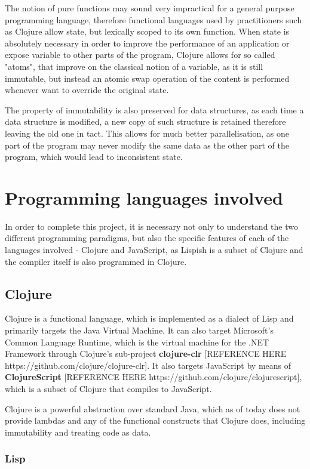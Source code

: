 The notion of pure functions may sound very impractical for a general purpose programming language, therefore functional languages used by practitioners such as Clojure allow state, but lexically scoped to its own function.
When state is absolutely necessary in order to improve the performance of an application or expose variable to other parts of the program, Clojure allows for so called "atoms", that improve on the classical notion of a variable, as it is still immutable, but instead an atomic swap operation of the content is performed whenever want to override the original state.

The property of immutability is also preserved for data structures, as each time a data structure is modified, a new copy of such structure is retained therefore leaving the old one in tact. This allows for much better parallelisation, as one part of the program may never modify the same data as the other part of the program, which would lead to inconsistent state.

\section{Programming languages involved}
In order to complete this project, it is necessary not only to understand the two different programming paradigms, but also the specific features of each of the languages involved - Clojure and JavaScript, as Lispish is a subset of Clojure and the compiler itself is also programmed in Clojure.

\subsection{Clojure}
Clojure is a functional language, which is implemented as a dialect of Lisp and primarily targets the Java Virtual Machine. It can also target Microsoft's Common Language Runtime, which is the virtual machine for the .NET Framework through Clojure's sub-project \textbf{clojure-clr} [REFERENCE HERE https://github.com/clojure/clojure-clr]. 
It also targets JavaScript by means of \textbf{ClojureScript} [REFERENCE HERE https://github.com/clojure/clojurescript], which is a subset of Clojure that compiles to JavaScript. 

Clojure is a powerful abstraction over standard Java, which as of today does not provide lambdas and any of the functional constructs that Clojure does, including immutability and treating code as data.
\cite{reflabel}

\subsubsection{Lisp}


